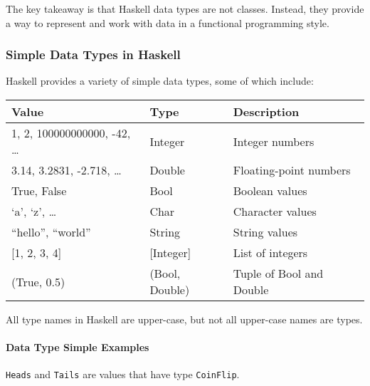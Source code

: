 The key takeaway is that Haskell data types are not classes. Instead,
they provide a way to represent and work with data in a functional
programming style.

\hypertarget{simple-data-types-in-haskell}{%
\subsubsection{Simple Data Types in
Haskell}\label{simple-data-types-in-haskell}}

Haskell provides a variety of simple data types, some of which include:

\begin{longtable}[]{@{}lll@{}}
\toprule
Value & Type & Description\tabularnewline
\midrule
\endhead
1, 2, 100000000000, -42, \ldots{} & Integer & Integer
numbers\tabularnewline
3.14, 3.2831, -2.718, \ldots{} & Double & Floating-point
numbers\tabularnewline
True, False & Bool & Boolean values\tabularnewline
`a', `z', \ldots{} & Char & Character values\tabularnewline
``hello'', ``world'' & String & String values\tabularnewline
{[}1, 2, 3, 4{]} & {[}Integer{]} & List of integers\tabularnewline
(True, 0.5) & (Bool, Double) & Tuple of Bool and Double\tabularnewline
\bottomrule
\end{longtable}

All type names in Haskell are upper-case, but not all upper-case names
are types.

\hypertarget{data-type-simple-examples}{%
\paragraph{Data Type Simple Examples}\label{data-type-simple-examples}}

\begin{Shaded}
\begin{Highlighting}[]
  \OtherTok{=}  \OperatorTok{|} 
\end{Highlighting}
\end{Shaded}

\texttt{Heads} and \texttt{Tails} are values that have type
\texttt{CoinFlip}.

\begin{Shaded}
\begin{Highlighting}[]
  \OtherTok{=}  \OperatorTok{|}  \OperatorTok{|}  \OperatorTok{|} 
\end{Highlighting}
\end{Shaded}

